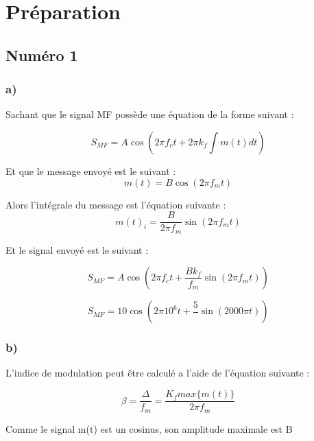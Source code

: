 
\chapter{Préparation}
\section*{Numéro 1}
\subsection*{a)}

Sachant que le signal MF possède une équation de la forme suivant :

\begin{equation}
	S_{MF} = A\cos(2\pi f_c t + 2\pi k_f \int m(t)dt)
\end{equation}

Et que le message envoyé est le suivant :
\begin{equation}
	m(t) = B \cos(2\pi f_m t)
\end{equation}

Alors l'intégrale du message est l'équation suivante :
\begin{equation}
	m(t)_i = \frac{B}{2\pi f_m}\sin(2\pi f_m t)
\end{equation}

Et le signal envoyé est le suivant :

\begin{equation}
	S_{MF} = A\cos(2\pi f_c t + \frac{B k_f}{f_m}\sin(2\pi f_m t))
\end{equation}


\begin{equation}
	S_{MF} = 10 \cos(2\pi 10^6 t + \frac{5 }{}\sin(2000\pi  t))
\end{equation}


\subsection*{b)}

L'indice de modulation peut être calculé a l'aide de l'équation suivante :

\begin{equation}
	\beta = \frac{\Delta}{f_m} = \frac{K_f max\{m(t)\}}{2\pi f_m}
\end{equation}

Comme le signal m(t) est un cosinus, son amplitude maximale est B

